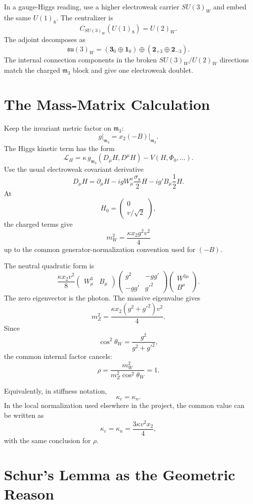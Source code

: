 \documentclass[11pt]{article}
\newcommand{\mthree}{\mathfrak m_3}
\newcommand{\su}{\mathfrak{su}}
\begin{document}
In a gauge-Higgs reading, use a higher electroweak carrier \(SU(3)_W\) and
embed the same \(U(1)_8\).  The centralizer is
\[
C_{SU(3)_W}(U(1)_8)=U(2)_W .
\]
The adjoint decomposes as
\[
\su(3)_W=(\mathbf 3_0\oplus\mathbf 1_0)
\oplus(\mathbf 2_{+3}\oplus\mathbf 2_{-3}).
\]
The internal connection components in the broken
\(SU(3)_W/U(2)_W\) directions match the charged \(\mthree\) block and give
one electroweak doublet.

\section{The Mass-Matrix Calculation}

Keep the invariant metric factor on \(\mthree\):
\[
g\big|_{\mthree}=x_2(-B)\big|_{\mthree}.
\]
The Higgs kinetic term has the form
\[
\mathcal L_H=
\kappa\, g_{\mthree}(D_\mu H,D^\mu H)-V(H,\Phi_0,\ldots).
\]
Use the usual electroweak covariant derivative
\[
D_\mu H
=\partial_\mu H
-i g W_\mu^a\frac{\sigma_a}{2}H
-i g' B_\mu\frac{1}{2}H .
\]
At
\[
H_0=\begin{pmatrix}0\\ v/\sqrt2\end{pmatrix},
\]
the charged terms give
\[
m_W^2=\frac{\kappa x_2 g^2v^2}{4}
\]
up to the common generator-normalization convention used for \((-B)\).

The neutral quadratic form is
\[
\frac{\kappa x_2v^2}{8}
\begin{pmatrix}W_\mu^3&B_\mu\end{pmatrix}
\begin{pmatrix}
g^2&-gg'\\
-gg'&g'^2
\end{pmatrix}
\begin{pmatrix}W^{3\mu}\\ B^\mu\end{pmatrix}.
\]
The zero eigenvector is the photon.  The massive eigenvalue gives
\[
m_Z^2=\frac{\kappa x_2(g^2+g'^2)v^2}{4}.
\]
Since
\[
\cos^2\theta_W=\frac{g^2}{g^2+g'^2},
\]
the common internal factor cancels:
\[
\rho=\frac{m_W^2}{m_Z^2\cos^2\theta_W}=1 .
\]

Equivalently, in stiffness notation,
\[
\kappa_c=\kappa_n .
\]
In the local normalization used elsewhere in the project, the common value
can be written as
\[
\kappa_c=\kappa_n=\frac{3\kappa v^2x_2}{4},
\]
with the same conclusion for \(\rho\).

\section{Schur's Lemma as the Geometric Reason}
\end{document}

